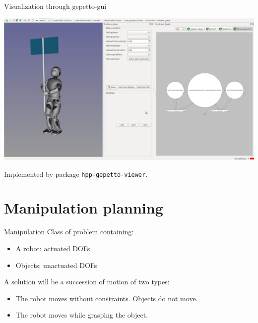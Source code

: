 %
%

\begin {frame} {Visualization through gepetto-gui}
  \begin{center}
    \includegraphics [width=.9\linewidth] {figures/gepetto-gui.png}
  \end{center}
  Implemented by package \texttt {hpp-gepetto-viewer}.
\end {frame}

\section {Manipulation planning}

%
%

\begin {frame} {Manipulation}
  Class of problem containing:
  \begin{itemize}
    \item A robot: actuated DOFs
    \item Objects: unactuated DOFs
  \end{itemize}
  \pause
  A solution will be a succession of motion of two types:
  \begin{itemize}
    \item The robot moves without constraints. Objects do not move.
    \item The robot moves while grasping the object.
  \end{itemize}
\end {frame}

